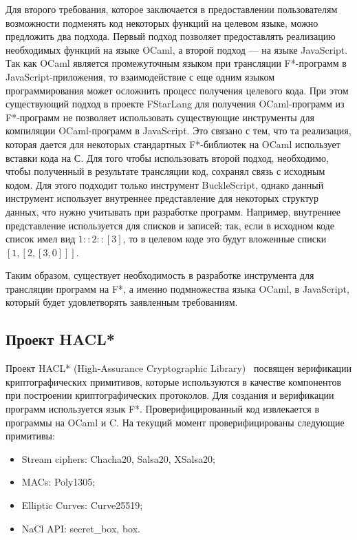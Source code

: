 Для второго требования, которое заключается в предоставлении пользователям возможности подменять код некоторых функций на целевом языке, можно предложить два подхода. Первый подход позволяет предоставлять реализацию необходимых функций на языке OCaml, а второй подход --- на языке JavaScript. Так как OCaml является промежуточным языком при трансляции F*-программ в JavaScript-приложения, то взаимодействие с еще одним языком программирования может осложнить процесс получения целевого кода. При этом существующий подход в проекте FStarLang для получения OCaml-программ из F*-программ не позволяет использовать существующие инструменты для компиляции OCaml-программ в JavaScript. Это связано с тем, что та реализация, которая дается для некоторых стандартных F*-библиотек на OCaml использует вставки кода на С. Для того чтобы использовать второй подход, необходимо, чтобы полученный в результате трансляции код, сохранял связь с исходным кодом. Для этого подходит только инструмент BuckleScript, однако данный инструмент использует внутреннее представление для некоторых структур данных, что нужно учитывать при разработке программ. Например, внутреннее представление используется для списков и записей; так, если в исходном коде список имел вид $1::2::[3]$, то в целевом коде это будут вложенные списки $[ 1, [ 2, [ 3, 0 ] ] ]$. 

Таким образом, существует необходимость в разработке инструмента для трансляции программ на F*, а именно подмножества языка OCaml, в JavaScript, который будет удовлетворять заявленным требованиям.

\subsection{Проект HACL*}

Проект HACL* (High-Assurance Cryptographic Library)~\cite{hacl_star} посвящен верификации криптографических примитивов, которые используются в качестве компонентов при построении криптографических протоколов. Для создания и верификации программ используется язык F*. Проверифицированный код извлекается в программы на OCaml и C. На текущий момент проверифицированы следующие примитивы: 

\begin{itemize}
    \item Stream ciphers: Chacha20, Salsa20, XSalsa20;
    \item MACs: Poly1305;
    \item Elliptic Curves: Curve25519;
    \item NaCl API: secret\_box, box.
\end{itemize}

